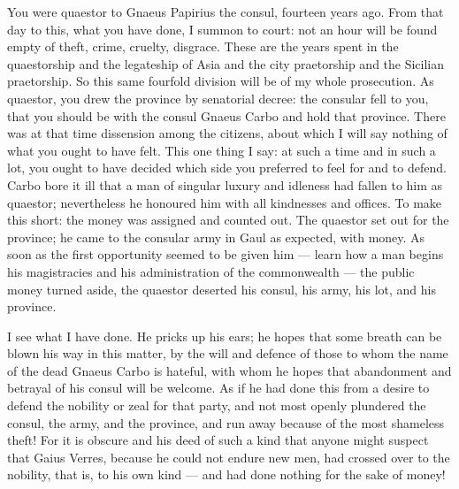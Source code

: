  You were quaestor to Gnaeus Papirius the consul, fourteen years ago. From that day to this, what you have done, I summon to court: not an hour will be found empty of theft, crime, cruelty, disgrace. These are the years spent in the quaestorship and the legateship of Asia and the city praetorship and the Sicilian praetorship. So this same fourfold division will be of my whole prosecution. As quaestor, you drew the province by senatorial decree: the consular fell to you, that you should be with the consul Gnaeus Carbo and hold that province. There was at that time dissension among the citizens, about which I will say nothing of what you ought to have felt. This one thing I say: at such a time and in such a lot, you ought to have decided which side you preferred to feel for and to defend. Carbo bore it ill that a man of singular luxury and idleness had fallen to him as quaestor; nevertheless he honoured him with all kindnesses and offices. To make this short: the money was assigned and counted out. The quaestor set out for the province; he came to the consular army in Gaul as expected, with money. As soon as the first opportunity seemed to be given him --- learn how a man begins his magistracies and his administration of the commonwealth --- the public money turned aside, the quaestor deserted his consul, his army, his lot, and his province.

 I see what I have done. He pricks up his ears; he hopes that some breath can be blown his way in this matter, by the will and defence of those to whom the name of the dead Gnaeus Carbo is hateful, with whom he hopes that abandonment and betrayal of his consul will be welcome. As if he had done this from a desire to defend the nobility or zeal for that party, and not most openly plundered the consul, the army, and the province, and run away because of the most shameless theft! For it is obscure and his deed of such a kind that anyone might suspect that Gaius Verres, because he could not endure new men, had crossed over to the nobility, that is, to his own kind --- and had done nothing for the sake of money!

